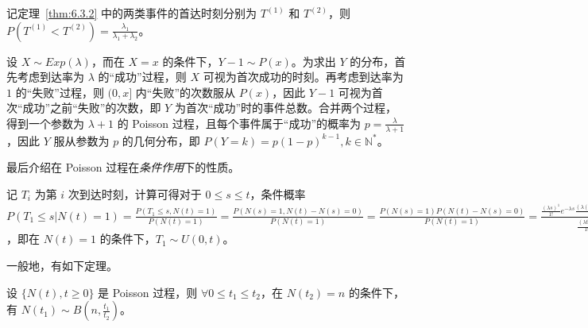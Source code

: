 \documentclass[../main.tex]{subfiles}
\begin{document}
\begin{theorem}\label{thm:6.3.3}
    记定理~\ref{thm:6.3.2} 中的两类事件的首达时刻分别为 $T^{(1)}$ 和 $T^{(2)}$，则 $P(T^{(1)}<T^{(2)})=\frac{\lambda_1}{\lambda_1+\lambda_2}$。
\end{theorem}

\begin{example}
    设 $X\sim Exp(\lambda)$，而在 $X=x$ 的条件下，$Y-1\sim P(x)$。为求出 $Y$ 的分布，首先考虑到达率为 $\lambda$ 的“成功”过程，则 $X$ 可视为首次成功的时刻。再考虑到达率为 $1$ 的“失败”过程，则 $(0,x]$ 内“失败”的次数服从 $P(x)$，因此 $Y-1$ 可视为首次“成功”之前“失败”的次数，即 $Y$ 为首次“成功”时的事件总数。合并两个过程，得到一个参数为 $\lambda+1$ 的 Poisson 过程，且每个事件属于“成功”的概率为 $p=\frac{\lambda}{\lambda+1}$，因此 $Y$ 服从参数为 $p$ 的几何分布，即 $P(Y=k)=p(1-p)^{k-1},k\in\mathbb N^*$。
\end{example}

最后介绍在 Poisson 过程在\emph{条件作用}下的性质。

记 $T_i$ 为第 $i$ 次到达时刻，计算可得对于 $0\leq s\leq t$，条件概率 $P(T_1\leq s|N(t)=1)=\frac{P(T_1\leq s,N(t)=1)}{P(N(t)=1)}=\frac{P(N(s)=1,N(t)-N(s)=0)}{P(N(t)=1)}=\frac{P(N(s)=1)P(N(t)-N(s)=0)}{P(N(t)=1)}=\frac{\frac{(\lambda s)^1}{1!}e^{-\lambda s}\frac{(\lambda(t-s))^0}{0!}e^{-\lambda(t-s)}}{\frac{(\lambda t)^1}{1!}e^{-\lambda t}}=\frac st$，即在 $N(t)=1$ 的条件下，$T_1\sim U(0,t)$。

一般地，有如下定理。

\begin{theorem}\label{thm:6.3.4}
    设 $\{N(t),t\geq0\}$ 是 Poisson 过程，则 $\forall0\leq t_1\leq t_2$，在 $N(t_2)=n$ 的条件下，有 $N(t_1)\sim B(n,\frac{t_1}{t_2})$。
\end{theorem}
\end{document}
